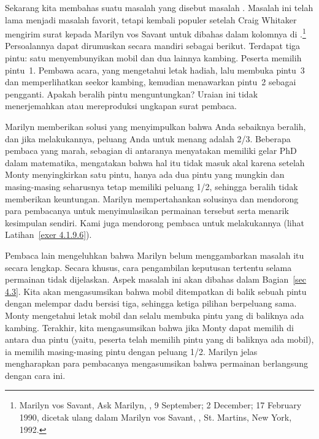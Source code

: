 \begin{example}\label{exam 4.5}
Sekarang kita membahas suatu masalah yang disebut masalah .   Masalah ini
telah lama menjadi masalah favorit, tetapi kembali populer setelah Craig Whitaker mengirim surat kepada Marilyn vos Savant untuk dibahas dalam kolomnya di .\footnote{Marilyn vos Savant, Ask Marilyn, , 9 
September;  2 December;  17  February 1990, dicetak ulang dalam Marilyn vos Savant, , St. Martins, New York, 1992.}  Persoalannya dapat dirumuskan secara mandiri sebagai berikut.
Terdapat tiga pintu: satu menyembunyikan mobil dan dua lainnya kambing.
Peserta memilih pintu~1. Pembawa acara, yang mengetahui letak hadiah, lalu membuka pintu~3 dan
memperlihatkan seekor kambing, kemudian menawarkan pintu~2 sebagai pengganti. Apakah beralih pintu
menguntungkan? Uraian ini tidak menerjemahkan atau mereproduksi ungkapan surat pembaca.
\par
Marilyn memberikan solusi yang menyimpulkan bahwa Anda sebaiknya beralih, dan jika melakukannya, peluang Anda untuk
menang adalah 2/3.  Beberapa pembaca yang marah, sebagian di antaranya menyatakan memiliki gelar PhD dalam
matematika, mengatakan bahwa hal itu tidak masuk akal karena setelah Monty menyingkirkan satu pintu, hanya ada dua
pintu yang mungkin dan masing-masing seharusnya tetap memiliki peluang 1/2, sehingga beralih
tidak memberikan keuntungan.  Marilyn mempertahankan solusinya dan mendorong para pembacanya untuk menyimulasikan permainan tersebut serta menarik
kesimpulan sendiri.  Kami juga mendorong pembaca untuk melakukannya (lihat
Latihan~\ref{exer 4.1.9.6}).
\par
Pembaca lain mengeluhkan bahwa Marilyn belum menggambarkan masalah itu secara lengkap.  Secara khusus,
cara pengambilan keputusan tertentu selama permainan tidak dijelaskan.  Aspek
masalah ini akan dibahas dalam Bagian~\ref{sec 4.3}.  Kita akan mengasumsikan bahwa mobil ditempatkan
di balik sebuah pintu dengan melempar dadu bersisi tiga, sehingga ketiga pilihan berpeluang sama.  Monty
mengetahui letak mobil dan selalu membuka pintu yang di baliknya ada kambing.  Terakhir, kita mengasumsikan bahwa jika 
Monty dapat memilih di antara dua pintu (yaitu, peserta telah memilih pintu yang di baliknya ada mobil), ia
memilih masing-masing pintu dengan peluang 1/2.  Marilyn
jelas mengharapkan para pembacanya mengasumsikan bahwa permainan berlangsung dengan cara ini.
\par

\end{example}
